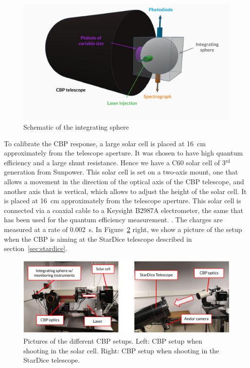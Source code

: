 \begin{figure}
    \centering
    \includegraphics[width=1\columnwidth]{fig/integrating_sphere_3d.pdf}
    \caption{Schematic of the integrating sphere}
    \label{fig:sphere}
\end{figure}

To calibrate the CBP response, a large solar cell is placed at \SI{16}{\cm} approximately from the telescope aperture. It was chosen to have high quantum efficiency and a large shunt resistance. Hence we have a C60 solar cell of 3$^{\mathrm{rd}}$ generation from Sunpower. This solar cell is set on a two-axis mount, one that allows a movement in the direction of the optical axis of the CBP telescope, and another axis that is vertical, which allows to adjust the height of the solar cell. It is placed at \SI{16}{\cm} approximately from the telescope aperture. This solar cell is connected via a coaxial cable to a Keysight B2987A electrometer, the same that has been used for the quantum efficiency measurement. . The charges are measured at a rate of \SI{0.002}{\second}. In Figure~\ref{fig:cbp_setup} right, we show a picture of the setup when the CBP is aiming at the StarDice telescope described in section~\ref{sec:stardice}.

\begin{figure}[ht]
\centering
\includegraphics[width=\textwidth]{fig/cbp_setup_cropped.pdf}
\caption{Pictures of the different CBP setups. Left: CBP setup when shooting in the solar cell. Right: CBP setup when shooting in the StarDice telescope.}
\label{fig:cbp_setup}
\end{figure}

